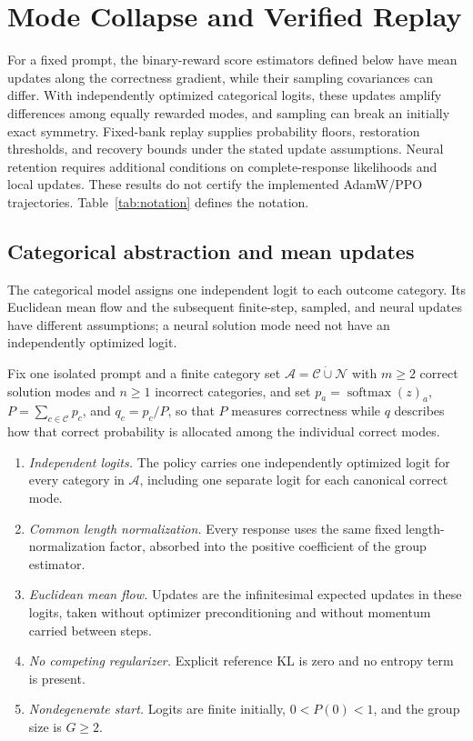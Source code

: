 \section{Mode Collapse and Verified Replay}
\label{app:theory}

For a fixed prompt, the binary-reward score estimators defined below have
mean updates along the correctness gradient, while their sampling
covariances can differ. With independently optimized categorical logits,
these updates amplify differences among equally rewarded modes, and sampling
can break an initially exact symmetry. Fixed-bank replay supplies
probability floors, restoration thresholds, and recovery bounds under the
stated update assumptions. Neural retention requires additional conditions
on complete-response likelihoods and local updates. These results do not
certify the implemented AdamW/PPO trajectories.
Table~\ref{tab:notation} defines the notation.

\subsection{Categorical abstraction and mean updates}
\label{app:theory-grpo-mean}

The categorical model assigns one independent logit to each outcome
category. Its Euclidean mean flow and the subsequent finite-step, sampled,
and neural updates have different assumptions; a neural solution mode need
not have an independently optimized logit.

\begin{assumption}
\label{ass:categorical-mean-flow}
Fix one isolated prompt and a finite category set
$\mathcal A=\mathcal C\mathbin{\dot\cup}\mathcal N$ with $m\ge2$ correct
solution modes and $n\ge1$ incorrect categories, and set
$p_a=\operatorname{softmax}(z)_a$, $P=\sum_{c\in\mathcal C}p_c$, and
$q_c=p_c/P$, so that $P$ measures correctness while $q$ describes how that
correct probability is allocated among the individual correct modes.
\begin{enumerate}
\item[(A1)] \emph{Independent logits.} The policy carries one independently
  optimized logit for every category in $\mathcal A$, including one separate
  logit for each canonical correct mode.
\item[(A2)] \emph{Common length normalization.} Every response uses the same
  fixed length-normalization factor, absorbed into the positive coefficient
  of the group estimator.
\item[(A3)] \emph{Euclidean mean flow.} Updates are the infinitesimal expected
  updates in these logits, taken without optimizer preconditioning and without
  momentum carried between steps.
\item[(A4)] \emph{No competing regularizer.} Explicit reference KL is zero and
  no entropy term is present.
\item[(A5)] \emph{Nondegenerate start.} Logits are finite initially,
  $0<P(0)<1$, and the group size is $G\ge2$.
\end{enumerate}
\end{assumption}

